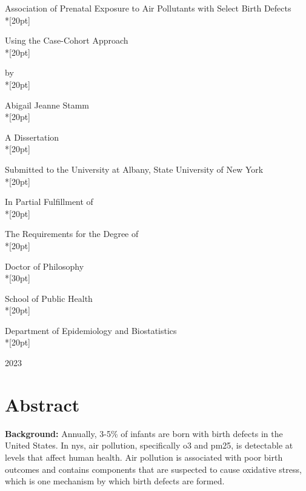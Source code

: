 \begin{titlepage}
\begin{center}

\pagestyle{empty}
\thispagestyle{empty}

\normalsize

Association of Prenatal Exposure to Air Pollutants with Select Birth Defects\\*[20pt]

Using the Case-Cohort Approach\\*[20pt]


by\\*[20pt]


Abigail Jeanne Stamm\\*[20pt]

\vfill


A Dissertation\\*[20pt]

Submitted to the University at Albany, State University of New York\\*[20pt]

In Partial Fulfillment of\\*[20pt]

The Requirements for the Degree of\\*[20pt]

Doctor of Philosophy\\*[30pt]

\vfill

School of Public Health\\*[20pt]

Department of Epidemiology and Biostatistics\\*[20pt]

2023
\end{center}

\pagebreak






\section*{Abstract}

\doublespacing

\textbf{Background:} 
Annually, 3-5\% of infants are born with birth defects in the United States. In \gls{nys}, air pollution, specifically \gls{o3} and \gls{pm25}, is detectable at levels that affect human health. Air pollution is associated with poor birth outcomes and contains components that are suspected to cause oxidative stress, which is one mechanism by which birth defects are formed.  


\end{titlepage}
